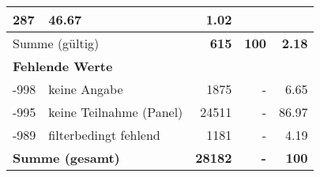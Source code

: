 \begin{longtable}{lXrrr}
       \num{287} &
       \num[round-mode=places,round-precision=2]{46.67} &
         \num[round-mode=places,round-precision=2]{1.02} \\
     \midrule
     \multicolumn{2}{l}{Summe (gültig)} &
       \textbf{\num{615}} &
     \textbf{\num{100}} &
       \textbf{\num[round-mode=places,round-precision=2]{2.18}} \\
     \multicolumn{5}{l}{\textbf{Fehlende Werte}}\\
       -998 &
       keine Angabe &
         \num{1875} &
        - &
         \num[round-mode=places,round-precision=2]{6.65} \\
       -995 &
       keine Teilnahme (Panel) &
         \num{24511} &
        - &
         \num[round-mode=places,round-precision=2]{86.97} \\
       -989 &
       filterbedingt fehlend &
         \num{1181} &
        - &
         \num[round-mode=places,round-precision=2]{4.19} \\
     \midrule
     \multicolumn{2}{l}{\textbf{Summe (gesamt)}} &
          \textbf{\num{28182}} &
        \textbf{-} &
        \textbf{\num{100}} \\
     \bottomrule
     \end{longtable}
     

